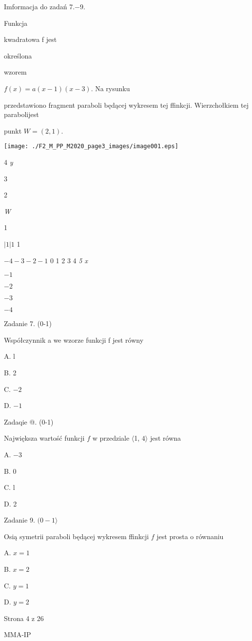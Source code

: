 \documentclass[a4paper,12pt]{article}
\begin{document}
Imformacja do zadań 7.$-9.$

Funkcja

kwadratowa f jest

określona

wzorem

$f(x)=a(x-1)(x-3)$. Na rysunku

przedstawiono fragment paraboli będącej wykresem tej ffinkcji. Wierzchołkiem tej parabolijest

punkt $W=(2,1).$
\begin{center}
\texttt{[image: ./F2\_M\_PP\_M2020\_page3\_images/image001.eps]}
\end{center}
4  {\it y}

3

2

{\it W}

1

$| 1  | 1$  1

$-4 -3  -2 -1$  0  1 2 3 4  {\it 5 x}

$-1$

$-2$

$-3$

$-4$

Zadanie 7. (0-1)

Współczynnik a we wzorze funkcji f jest równy

A. l

B. 2

C. $-2$

D. $-1$

Zadaqie @. (0-1)

Największa wartość funkcji $f$ w przedziale $\langle$1, $ 4\rangle$ jest równa

A. $-3$

B. 0

C. l

D. 2

Zadanie 9. $(0-1\rangle$

Osią symetrii paraboli będącej wykresem ffinkcji $f$ jest prosta o równaniu

A. $x=1$

B. $x=2$

C. $y=1$

D. $y=2$

Strona 4 z 26

MMA-IP
\end{document}
